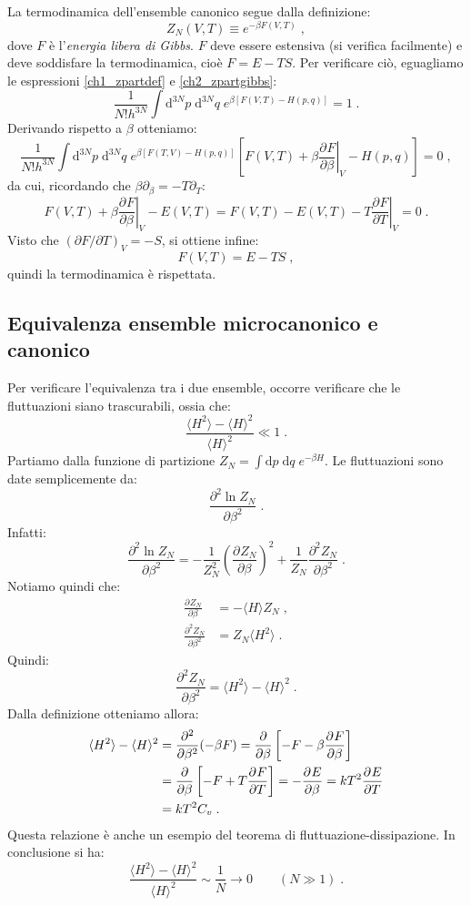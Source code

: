 \documentclass[10pt,a4paper]{report}
\theoremstyle{definition}
\newcommand{\pdev}[3][]{\frac{\partial^{#1} #2}{\partial #3^{#1}}}
\numberwithin{equation}{section}
\newcommand{\diff}[1][]{\mathrm{d}#1}
\newcommand{\bra}{\langle}
\newcommand{\ket}{\rangle}
\begin{document}
La termodinamica dell'ensemble canonico segue dalla definizione:
\begin{equation}
Z_N(V,T)\equiv e^{-\beta F(V,T)}\;, \label{ch2_zpartgibbs}
\end{equation}
dove $F$ è l'\emph{energia libera di Gibbs}. $F$ deve essere estensiva (si verifica facilmente) e deve soddisfare la termodinamica, cioè $F=E-TS$. Per verificare ciò, eguagliamo le espressioni \eqref{ch1_zpartdef} e \eqref{ch2_zpartgibbs}:
$$
\frac{1}{N!h^{3N}}\int\diff^{3N}{p}\;\diff^{3N}{q}\; e^{\beta[F(V,T)-H(p,q)]}=1\;.
$$
Derivando rispetto a $\beta$ otteniamo:
$$
\frac{1}{N!h^{3N}}\int\diff^{3N}{p}\;\diff^{3N}{q}\;e^{\beta[F(T,V)-H(p,q)]}\left[F(V,T)+\beta\left.\pdev{F}{\beta}\right|_V-H(p,q)\right]=0\;,
$$
da cui, ricordando che $\beta\partial_{\beta}=-T\partial_{T}$:
$$
F(V,T)+\beta\left.\pdev{F}{\beta}\right|_V-E(V,T)=F(V,T)-E(V,T)-T\left.\pdev{F}{T}\right|_V=0\;.
$$
Visto che $(\partial F/\partial T)_V=-S$, si ottiene infine:
\begin{equation}
F(V,T)=E-TS\;,
\end{equation}
quindi la termodinamica è rispettata.
\subsection{Equivalenza ensemble microcanonico e canonico}
Per verificare l'equivalenza tra i due ensemble, occorre verificare che le fluttuazioni siano trascurabili, ossia che:
\begin{equation}
\frac{\bra H^2\ket -\bra H\ket^2}{\bra H\ket^2}\ll 1\;.
\end{equation}
Partiamo dalla funzione di partizione $Z_N=\int \diff{p}\;\diff{q}\; e^{-\beta H}$. Le fluttuazioni sono date semplicemente da:
$$
\pdev[2]{\ln Z_N}{\beta}\;.
$$
Infatti:
\begin{equation}
\pdev[2]{\ln Z_N}{\beta}=-\frac{1}{Z_N^2}\left(\pdev{Z_N}{\beta}\right)^2+\frac{1}{Z_N}\pdev[2]{Z_N}{\beta}\;.
\end{equation}
Notiamo quindi che:
\begin{align}
\pdev{Z_N}{\beta} &= -\bra H\ket Z_N\;, \\
\pdev[2]{Z_N}{\beta} &= Z_N\bra H^2\ket\;.
\end{align}
Quindi:
\begin{equation}
\pdev[2]{Z_N}{\beta}=\bra H^2\ket -\bra H\ket^2\;.
\end{equation}
Dalla definizione otteniamo allora:
\begin{align}
\bra H^2\ket-\bra H\ket^2 &= \frac{\partial^2}{\partial\beta^2}(-\beta F)=\frac{\partial}{\partial\beta}\left[-F-\beta\pdev{F}{\beta}\right] \notag \\
&= \frac{\partial}{\partial\beta}\left[-F+T\pdev{F}{T}\right]=-\pdev{E}{\beta} = kT^2\pdev{E}{T} \notag \\
&= kT^2C_v\;.
\end{align}
Questa relazione è anche un esempio del teorema di fluttuazione-dissipazione. In conclusione si ha:
\begin{equation}
\frac{\bra H^2\ket-\bra H\ket^2}{\bra H\ket^2}\sim \frac{1}{N}\to 0\qquad (N\gg 1)\;.
\end{equation}
\end{document}

